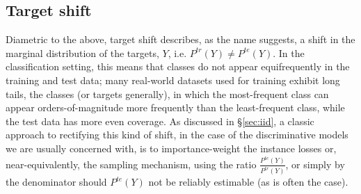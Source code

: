 \subsection{Target shift}\label{ssec:label-shift}
Diametric to the above, target shift describes, as the name suggests, a shift in the
marginal distribution of the targets, \(Y\), i.e. \( P^{tr}(Y) \neq P^{te}(Y) \).
%
In the classification setting, this means that classes do not appear equifrequently in the training
and test data; many real-world datasets used for training exhibit long tails, \wrt{} the classes
(or targets generally), in which the most-frequent class can appear orders-of-magnitude more
frequently than the least-frequent class, while the test data has more even coverage.
%
As discussed in \S\ref{sec:iid}, a classic approach to rectifying this kind of shift, in the case of
the discriminative models we are usually concerned with, is to  importance-weight the instance
losses or, near-equivalently, the sampling mechanism, using the ratio \(\frac{P^{te}(Y)}{P^{tr}(Y)}
\), or simply by the denominator should \( P^{te}(Y)\) not be reliably estimable (as is often the
case).
%
%
